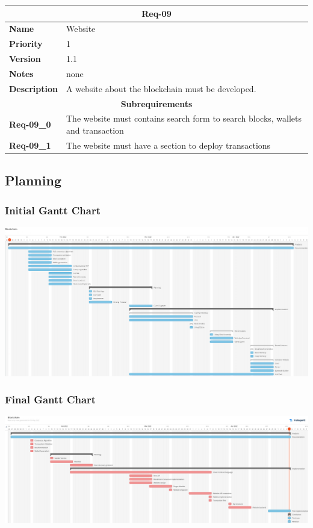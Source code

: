 \documentclass[../documentation.tex]{subfiles}
\begin{document}
\bgroup{}
\def\arraystretch{1.25}
\begin{center}
    \begin{tabular}{ |l|p{9cm}| }
        \hline
        \multicolumn{2}{|c|}{\textbf{Req-09}} \\
        \hline
        \textbf{Name} & Website \\
        \hline
        \textbf{Priority} & 1 \\
        \hline
        \textbf{Version} & 1.1 \\
        \hline
        \textbf{Notes} & none \\
        \hline
        \textbf{Description} & A website about the blockchain must be developed. \\
        \hline
        \multicolumn{2}{|c|}{\textbf{Subrequirements}} \\
        \hline
        \textbf{Req-09\_0} & The website must contains search form to search blocks, wallets and transaction \\
        \hline
        \textbf{Req-09\_1} & The website must have a section to deploy transactions \\
        \hline
    \end{tabular}
\end{center}
\egroup{}

\pagebreak

\subsection{Planning}

\subsubsection{Initial Gantt Chart}

\includegraphics[width=\textwidth]{images/gantt1.png}

\subsubsection{Final Gantt Chart}

\includegraphics[width=\textwidth]{images/gantt2.png}
\end{document}
